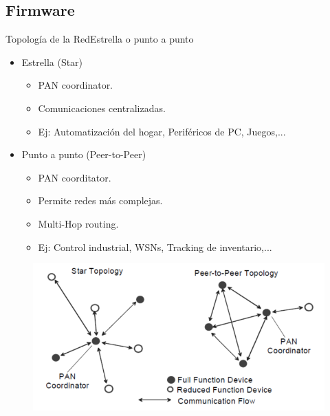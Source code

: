 \documentclass[aspectratio=169, handout]{beamer}
\begin{document}
\subsection[Firmware]{Firmware}
\begin{frame}{Topología de la Red}{Estrella o punto a punto}

\begin{minipage}[c]{1.0\linewidth}
	\begin{minipage}[c]{0.45\linewidth}
		\begin{itemize}
			\item Estrella (Star)
			\begin{itemize}
				\item PAN coordinator.
				\item Comunicaciones centralizadas.
				\item Ej: Automatización del hogar, Periféricos de PC, Juegos,...
					\end{itemize}
			\vspace{10px}
			\item Punto a punto (Peer-to-Peer)
			\begin{itemize}
				\item PAN coorditator.
				\item Permite redes más complejas.
				\item Multi-Hop routing.
				\item Ej: Control industrial,  WSNs, Tracking de inventario,...
			\end{itemize}
	  	\end{itemize}	
	\end{minipage}
	\hspace{-20px}
	\begin{minipage}[c]{0.7\linewidth}
		\begin{figure}[H]
			{\includegraphics[width=.7\textwidth]{./imagenes/Topology}}
		\end{figure}	  	  	
	\end{minipage}
\end{minipage}
\end{frame}
\end{document}
